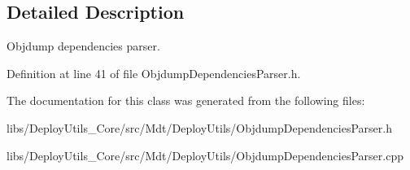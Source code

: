 \subsection{Detailed Description}
Objdump dependencies parser. 

Definition at line 41 of file Objdump\+Dependencies\+Parser.\+h.



The documentation for this class was generated from the following files\+:\begin{DoxyCompactItemize}
\item 
libs/\+Deploy\+Utils\+\_\+\+Core/src/\+Mdt/\+Deploy\+Utils/Objdump\+Dependencies\+Parser.\+h\item 
libs/\+Deploy\+Utils\+\_\+\+Core/src/\+Mdt/\+Deploy\+Utils/Objdump\+Dependencies\+Parser.\+cpp\end{DoxyCompactItemize}
